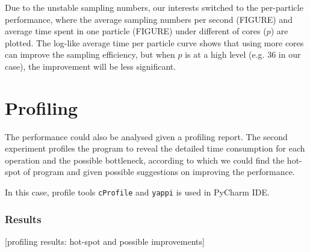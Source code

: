 \documentclass[12pt,a4paper]{report}
\begin{document}
Due to the unstable sampling numbers, our interests switched to the per-particle performance, where the average sampling numbers per second (FIGURE) and average time spent in one particle (FIGURE) under different of cores ($p$) are plotted. The log-like average time per particle curve shows that using more cores can improve the sampling efficiency, but when $p$ is at a high level (e.g. 36 in our case), the improvement will be less significant.

\section{Profiling}

The performance could also be analysed given a profiling report. The second experiment profiles the program to reveal the detailed time consumption for each operation and the possible bottleneck, according to which we could find the hot-spot of program and given possible suggestions on improving the performance. 

In this case, profile tools \verb|cProfile| and \verb|yappi| is used in PyCharm IDE.

\subsubsection{Results} 

[profiling results: hot-spot and possible improvements]

















\end{document}
